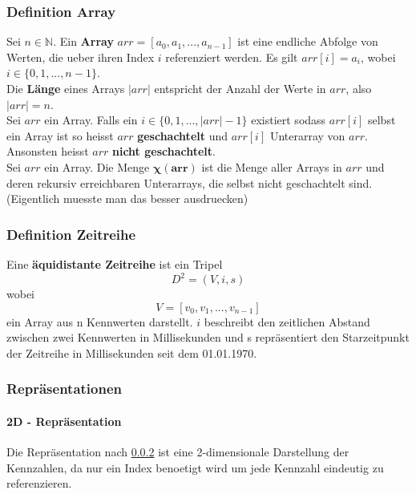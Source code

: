 \documentclass[12pt]{article}
\begin{document}
		\subsubsection{Definition Array}
		Sei $n \in \mathbb{N}$. Ein \textbf{Array} $arr = [a_{0}, a_{1}, ..., a_{n-1}]$ ist eine endliche Abfolge von Werten, die ueber ihren Index $i$ referenziert werden. Es gilt $arr[i] = a_{i}$, wobei $i \in \{0,1, ..., n-1\}$. \\[0.2cm]
		Die \textbf{Länge} eines Arrays $|arr|$ entspricht der Anzahl der Werte in $arr$, also $|arr| = n$.\\[0.4cm]
		Sei $arr$ ein Array. Falls ein $i \in \{0,1, ..., |arr| - 1\}$ existiert sodass $arr[i]$ selbst ein Array ist so heisst $arr$ \textbf{geschachtelt} und $arr[i]$ Unterarray von $arr$. Ansonsten heisst $arr$ \textbf{nicht geschachtelt}.\\[0.4cm]
		Sei $arr$ ein Array. Die Menge $\boldsymbol{\chi(arr)}$ ist die Menge aller Arrays in $arr$ und deren rekursiv erreichbaren Unterarrays, die selbst nicht geschachtelt sind. (Eigentlich muesste man das besser ausdruecken)
		\subsubsection{Definition Zeitreihe}
		\label{sec: def}
		Eine \textbf{äquidistante Zeitreihe} ist ein Tripel 
			\begin{equation}
				D^{2} = (V, i, s)
			\end{equation}
		wobei
			\begin{equation}
				V = [v_{0}, v_{1}, ..., v_{n - 1}]
			\end{equation}
		ein Array aus n Kennwerten darstellt.
		$i$ beschreibt den zeitlichen Abstand zwischen zwei Kennwerten in Millisekunden und s repräsentiert den Starzeitpunkt der Zeitreihe in 		Millisekunden seit dem 01.01.1970.
		\subsubsection{Repräsentationen}
			\paragraph{2D - Repräsentation}
				Die Repräsentation nach \ref{sec: def} ist eine 2-dimensionale Darstellung der Kennzahlen, da nur ein Index benoetigt wird um jede Kennzahl 						eindeutig zu referenzieren.
				
\end{document}
